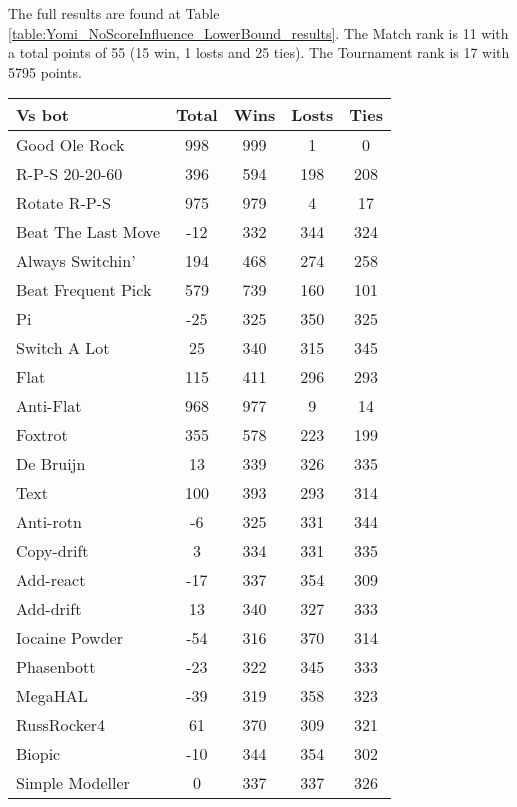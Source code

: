 The full results are found at Table \ref{table:Yomi_NoScoreInfluence_LowerBound_results}. The Match rank is 11 with a total points of 55 (15 win, 1 losts and 25 ties). The Tournament rank is 17 with 5795 points.

\begin{table*}
    \caption{Yomi No Score Influence Lower Bound results}
    \label{table:Yomi_NoScoreInfluence_LowerBound_results}
    \centering
    \begin{tabular}{|l|c|c|c|c|}
        \hline
        \textbf{Vs bot} & \textbf{Total} & \textbf{Wins} & \textbf{Losts} & \textbf{Ties} \\ \hline
Good Ole Rock & 998 & 999 & 1 & 0 \\ \hline 
R-P-S 20-20-60 & 396 & 594 & 198 & 208 \\ \hline 
Rotate R-P-S & 975 & 979 & 4 & 17 \\ \hline 
Beat The Last Move & -12 & 332 & 344 & 324 \\ \hline 
Always Switchin' & 194 & 468 & 274 & 258 \\ \hline 
Beat Frequent Pick & 579 & 739 & 160 & 101 \\ \hline 
Pi & -25 & 325 & 350 & 325 \\ \hline 
Switch A Lot & 25 & 340 & 315 & 345 \\ \hline 
Flat & 115 & 411 & 296 & 293 \\ \hline 
Anti-Flat & 968 & 977 & 9 & 14 \\ \hline 
Foxtrot & 355 & 578 & 223 & 199 \\ \hline 
De Bruijn & 13 & 339 & 326 & 335 \\ \hline 
Text & 100 & 393 & 293 & 314 \\ \hline 
Anti-rotn & -6 & 325 & 331 & 344 \\ \hline 
Copy-drift & 3 & 334 & 331 & 335 \\ \hline 
Add-react & -17 & 337 & 354 & 309 \\ \hline 
Add-drift & 13 & 340 & 327 & 333 \\ \hline 
Iocaine Powder & -54 & 316 & 370 & 314 \\ \hline 
Phasenbott & -23 & 322 & 345 & 333 \\ \hline 
MegaHAL & -39 & 319 & 358 & 323 \\ \hline 
RussRocker4 & 61 & 370 & 309 & 321 \\ \hline 
Biopic & -10 & 344 & 354 & 302 \\ \hline 
Simple Modeller & 0 & 337 & 337 & 326 \\ \hline 

\end{tabular}
\end{table*}
